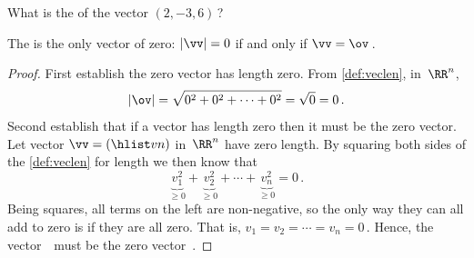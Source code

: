 \begin{activity}
What is the  of the vector \((2,-3,6)\)\,?
\end{activity}




\begin{theorem} \label{thm:veclen0}
The  is the only vector of  zero:
 \(|\vv|=0\) if and only if \(\vv=\ov\)\,.
\end{theorem}

\begin{proof} 
First establish the zero vector has length zero.
From \cref{def:veclen}, in~\(\RR^n\),
\begin{equation*}
|\ov|=\sqrt{0^2+0^2+\cdots+0^2}=\sqrt{0}=0\,.
\end{equation*}
Second establish that if a vector has length zero then it must be the zero vector.
Let vector \(\vv=(\hlist vn)\) in~\(\RR^n\) have zero length.
By squaring both sides of the \cref{def:veclen} for length we then know that
\begin{equation*}
\underbrace{v_1^2}_{\geq0}+\underbrace{v_2^2}_{\geq0}
+\cdots+\underbrace{v_n^2}_{\geq0}=0\,.
\end{equation*}
Being squares, all terms on the left are non-negative, so the only way they can all add to zero is if they are all zero.
That is, \(v_1=v_2=\cdots=v_n=0\)\,.
Hence, the vector~\vv\ must be the zero vector~\ov.
\end{proof}






\sectionExercises


